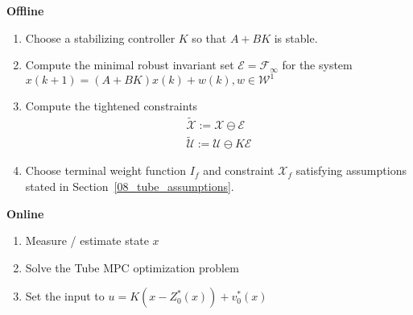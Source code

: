 \newpar{}

\textbf{Offline}
\begin{enumerate}
    \item Choose a stabilizing controller $K$ so that $A + BK$ is stable.
    \item Compute the minimal robust invariant set $\mathcal{E} = \mathcal{F}_\infty$ for the system $x(k+1) = (A + BK )x(k) + w(k), w \in \mathcal{W}^1$
    \item Compute the tightened constraints \begin{gather*}
              \widetilde{\mathcal{X}}:=\mathcal{X} \ominus \mathcal{E} \\
              \widetilde{\mathcal{U}}:=\mathcal{U} \ominus K\mathcal{E}
          \end{gather*}
    \item Choose terminal weight function $I_f$ and constraint $\mathcal{X}_f$ satisfying assumptions stated in Section~\ref{08_tube_assumptions}.
\end{enumerate}

\textbf{Online}
\begin{enumerate}
    \item Measure / estimate state $x$
    \item Solve the Tube MPC optimization problem
    \item Set the input to $u = K(x-Z_0^*(x))+v_0^*(x)$
\end{enumerate}

